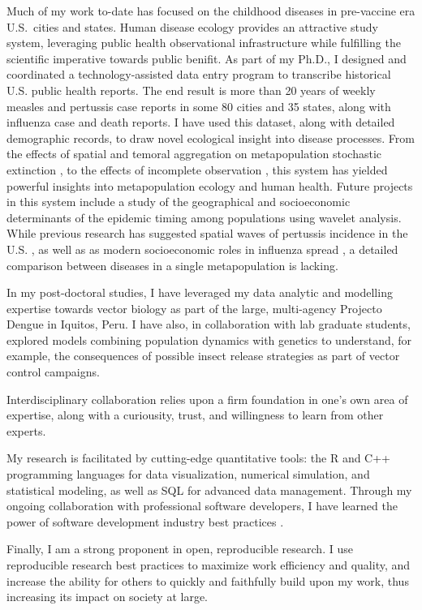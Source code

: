 \documentclass[12pt]{article}
\begin{document}
Much of my work to-date has focused on the childhood diseases 
in pre-vaccine era U.S.\ cities and 
states.  Human disease ecology provides an 
attractive study system, 
leveraging public health observational 
infrastructure while 
fulfilling the scientific imperative towards public benifit.
As part of my Ph.D., I designed and coordinated a technology-assisted
data entry program to transcribe historical U.S. 
public health reports. The end result is more than 
20 years of weekly measles and
pertussis case reports in some 80 cities and 35 
states, along with influenza case and death reports.
I have used this dataset, along with detailed demographic records, to draw novel ecological insight into 
disease processes. From the 
effects of spatial and temoral aggregation on metapopulation stochastic
extinction \citep{gunning2013probabilistic}, to the 
effects of incomplete
observation \citep{gunning2014conserved}, this system
has yielded powerful insights into metapopulation 
ecology and human health.
Future projects in this system include a study of 
the geographical and socioeconomic determinants of 
the epidemic timing among populations 
using wavelet analysis.  While previous research has 
suggested spatial waves of pertussis incidence 
in the U.S. \citep{choisy2012changing}, as well as 
as modern socioeconomic roles in influenza spread \citep{viboud2006synchrony}, a detailed
comparison between diseases in a single 
metapopulation is lacking.

In my post-doctoral studies, I have leveraged my 
data analytic and modelling expertise towards
vector biology as part of the large, multi-agency
Projecto Dengue in Iquitos, Peru. 
I have also, in collaboration with lab graduate
students, explored models
combining population dynamics with genetics to 
understand, for example, the consequences of 
possible insect release strategies as part of 
vector control campaigns.  





Interdisciplinary collaboration relies upon a firm
foundation in one's own area of expertise, along
with a curiousity, trust, and willingness to learn
from other experts.

My research is facilitated by cutting-edge quantitative tools:
the R and C++ programming languages for data visualization,
numerical simulation, and statistical modeling, as well as SQL for 
advanced data management. Through my ongoing 
collaboration with professional software developers,
I have learned the power of software
development industry best practices \citep{spolsky2000joel}.

Finally, I am a strong proponent in open, 
reproducible research. 
I use reproducible research best practices 
to maximize work efficiency and quality, and increase
the ability for others to quickly and faithfully 
build upon my work, thus increasing its impact
on society at large.


\end{document}
